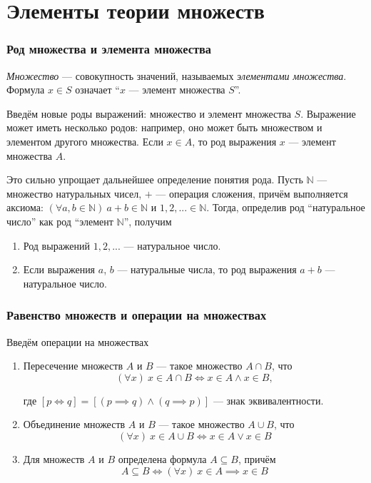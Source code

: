 \part{Элементы теории множеств}

\section{Род множества и элемента множества}

 {\it Множество} --- совокупность значений, называемых {\it элементами множества}.
Формула $x\in S$ означает ``$x$ --- элемент множества $S$''.

Введём новые роды выражений: множество и элемент множества $S$.
Выражение может иметь несколько родов: например, оно может быть множеством
и элементом другого множества.
Если $x\in A$, то род выражения $x$ --- элемент множества $A$.

\newcommand\N{\mathbb N}
Это сильно упрощает дальнейшее определение понятия рода. Пусть $\N$ --- множество
натуральных чисел, $+$ --- операция сложения, причём выполняется
аксиома: $(\forall a,b\in\N)~a+b\in\N$
и $1,2,...\in\N$. Тогда, определив род ``натуральное число'' как род ``элемент $\N$'',
получим
\begin{enumerate}
	\item{}Род выражений $1,2,...$ --- натуральное число.
	\item{}Если выражения $a$, $b$ --- натуральные числа,
	то род выражения $a+b$ --- натуральное число.
\end{enumerate}

\section{Равенство множеств и операции на множествах}

Введём операции на множествах
\begin{enumerate}
	\item{}Пересечение множеств $A$ и $B$ --- такое множество $A\cap B$, что
	\[
		(\forall x)~x\in A\cap B\iff x\in A\land x\in B,
	\]

	где $[p\iff q]=[(p\implies q)\land (q\implies p)]$ --- знак эквивалентности.

	\item{}Объединение множеств $A$ и $B$ --- такое множество $A\cup B$, что
	\[
		(\forall x)~x\in A\cup B\iff x\in A\lor x\in B
	\]

	\item{}Для множеств $A$ и $B$ определена формула $A\subseteq B$, причём
	\[
		A\subseteq B\iff (\forall x)~x\in A\implies x\in B
	\]
\end{enumerate}

